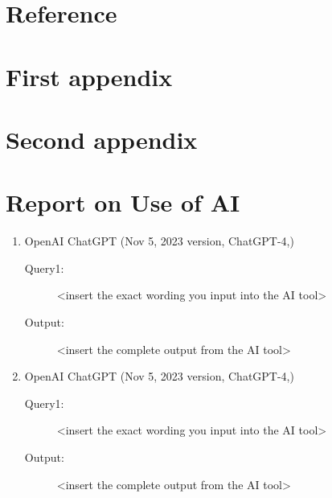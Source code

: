 \documentclass{mcmthesis}
\begin{document}
\newpage
\section*{Reference} %
\printbibliography




\begin{appendices}
\section{First appendix}
\section{Second appendix}
\end{appendices}




\newpage
{}
\setcounter{lastpage}{\value{page}}
\thispagestyle{empty} 

\section*{Report on Use of AI}

\begin{enumerate}
\item OpenAI ChatGPT (Nov 5, 2023 version, ChatGPT-4,) 
\begin{description}
	\item[Query1:] <insert the exact wording you input into the AI tool> 
	\item[Output:] <insert the complete output from the AI tool>
\end{description}
	
\item OpenAI ChatGPT (Nov 5, 2023 version, ChatGPT-4,) 
\begin{description}
	\item[Query1:] <insert the exact wording you input into the AI tool> 
	\item[Output:] <insert the complete output from the AI tool>
\end{description}

\end{enumerate}

\clearpage
\setcounter{page}{\value{lastpage}}
\end{document}
